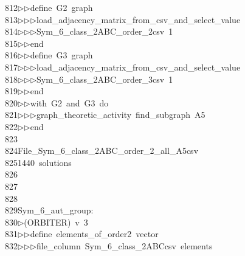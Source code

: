 \begin{tabbing}
812\>$\triangleright$\>$\triangleright$\>define\ G2\ graph\ \\[0pt]
813\>$\triangleright$\>$\triangleright$\>$\triangleright$\>load\_adjacency\_matrix\_from\_csv\_and\_select\_value\ \\[0pt]
814\>$\triangleright$\>$\triangleright$\>$\triangleright$\>Sym\_6\_class\_2ABC\_order\_2csv\ 1\ \\[0pt]
815\>$\triangleright$\>$\triangleright$\>end\ \\[0pt]
816\>$\triangleright$\>$\triangleright$\>define\ G3\ graph\ \\[0pt]
817\>$\triangleright$\>$\triangleright$\>$\triangleright$\>load\_adjacency\_matrix\_from\_csv\_and\_select\_value\ \\[0pt]
818\>$\triangleright$\>$\triangleright$\>$\triangleright$\>Sym\_6\_class\_2ABC\_order\_3csv\ 1\ \\[0pt]
819\>$\triangleright$\>$\triangleright$\>end\ \\[0pt]
820\>$\triangleright$\>$\triangleright$\>with\ G2\ and\ G3\ do\ \\[0pt]
821\>$\triangleright$\>$\triangleright$\>$\triangleright$\>graph\_theoretic\_activity\ find\_subgraph\ A5\ \\[0pt]
822\>$\triangleright$\>$\triangleright$\>end\ \\[0pt]
823\>\\[0pt]
824\>File\_Sym\_6\_class\_2ABC\_order\_2\_all\_A5csv\\[0pt]
825\>1440\ solutions\\[0pt]
826\>\\[0pt]
827\>\\[0pt]
828\>\\[0pt]
829\>Sym\_6\_aut\_group:\\[0pt]
830\>$\triangleright$\>(ORBITER)\ v\ 3\ \\[0pt]
831\>$\triangleright$\>$\triangleright$\>define\ elements\_of\_order2\ vector\ \\[0pt]
832\>$\triangleright$\>$\triangleright$\>$\triangleright$\>file\_column\ Sym\_6\_class\_2ABCcsv\ elements\ \\[0pt]

\end{tabbing}
